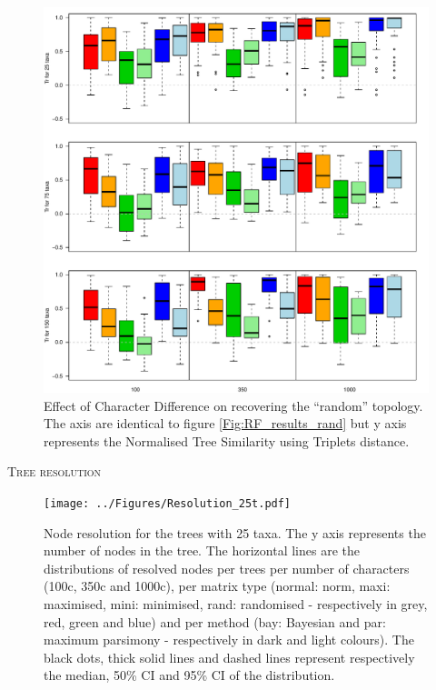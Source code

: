 \documentclass[12pt,letterpaper]{article}
\renewcommand{\section}[1]{%
\bigskip
\begin{center}
\begin{Large}
\normalfont\scshape #1
\medskip
\end{Large}
\end{center}}
\begin{document}
\begin{figure}[!htbp]
\centering
   \includegraphics[width=1\textwidth]{../Figures/Tr_results_null.pdf}
\caption{Effect of Character Difference on recovering the ``random'' topology. The axis are identical to figure \ref{Fig:RF_results_rand} but y axis represents the Normalised Tree Similarity using Triplets distance.}
\label{Fig:Tr_results_rand}
\end{figure}


\section{Tree resolution}

\begin{figure}[!htbp]
\centering
   \texttt{[image: ../Figures/Resolution\_25t.pdf]}
\caption{Node resolution for the trees with 25 taxa. The y axis represents the number of nodes in the tree. The horizontal lines are the distributions of resolved nodes per trees per number of characters (100c, 350c and 1000c), per matrix type (normal: norm, maxi: maximised, mini: minimised, rand: randomised - respectively in grey, red, green and blue) and per method (bay: Bayesian and par: maximum parsimony - respectively in dark and light colours). The black dots, thick solid lines and dashed lines represent respectively the median, 50\% CI and 95\% CI of the distribution.}
\label{Fig:Resolution_25t}
\end{figure}
\end{document}
